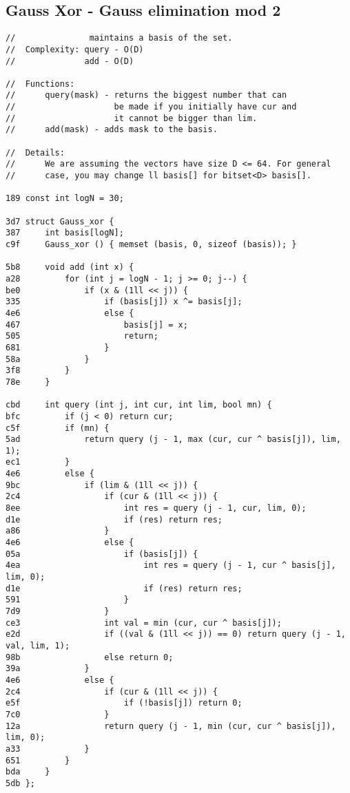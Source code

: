 \documentclass[11pt, a4paper, twoside]{article}
\begin{document}
\subsection{ Gauss Xor - Gauss elimination mod 2}
\begin{lstlisting}
//               maintains a basis of the set.
//  Complexity: query - O(D)
//              add - O(D)

//  Functions:
//      query(mask) - returns the biggest number that can
//                    be made if you initially have cur and
//                    it cannot be bigger than lim.
//      add(mask) - adds mask to the basis.

//  Details:
//      We are assuming the vectors have size D <= 64. For general
//      case, you may change ll basis[] for bitset<D> basis[].

189 const int logN = 30;

3d7 struct Gauss_xor {
387     int basis[logN];
c9f     Gauss_xor () { memset (basis, 0, sizeof (basis)); }
     
5b8     void add (int x) {
a28         for (int j = logN - 1; j >= 0; j--) {
be0             if (x & (1ll << j)) {
335                 if (basis[j]) x ^= basis[j];
4e6                 else {
467                     basis[j] = x;
505                     return;
681                 }
58a             }
3f8         }
78e     }
     
cbd     int query (int j, int cur, int lim, bool mn) {
bfc         if (j < 0) return cur;
c5f         if (mn) {
5ad             return query (j - 1, max (cur, cur ^ basis[j]), lim, 1);
ec1         }
4e6         else {
9bc             if (lim & (1ll << j)) {
2c4                 if (cur & (1ll << j)) {
8ee                     int res = query (j - 1, cur, lim, 0);
d1e                     if (res) return res;
a86                 }
4e6                 else {
05a                     if (basis[j]) {
4ea                         int res = query (j - 1, cur ^ basis[j], lim, 0);
d1e                         if (res) return res;
591                     }
7d9                 }
ce3                 int val = min (cur, cur ^ basis[j]);
e2d                 if ((val & (1ll << j)) == 0) return query (j - 1, val, lim, 1);
98b                 else return 0;
39a             }
4e6             else {
2c4                 if (cur & (1ll << j)) {
e5f                     if (!basis[j]) return 0;
7c0                 }
12a                 return query (j - 1, min (cur, cur ^ basis[j]), lim, 0);
a33             }
651         }
bda     }
5db };
\end{lstlisting}
\end{document}
